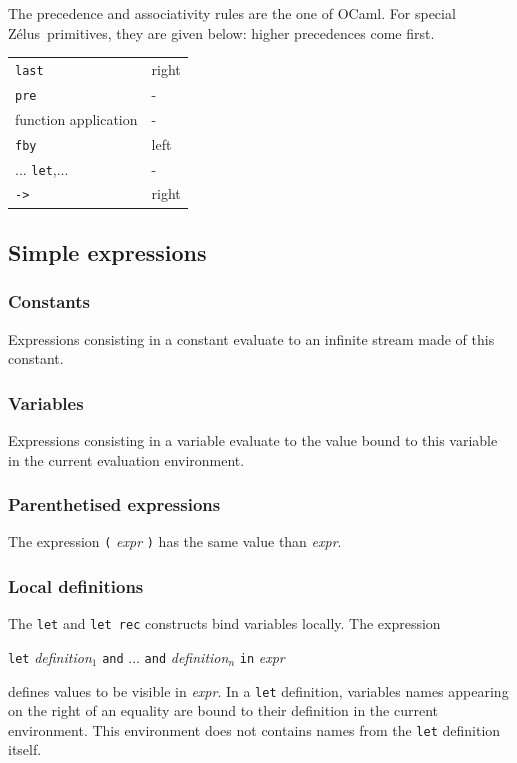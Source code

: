 \documentclass[11pt,titlepage,twoside]{report}
\newcommand{\zelus}{{\sf Z\'elus}}
\newcommand{\ocaml}{{\sf OCaml}}
\newcommand{\Let}{\mbox{{\tt let}}}
\newcommand{\Rec}{\mbox{{\tt rec}}}
\newcommand{\In}{\mbox{{\tt in}}}
\newcommand{\And}{\mbox{{\tt and}}}
\newcommand{\Pre}{\mbox{{\tt pre}}}
\newcommand{\Last}{\mbox{{\tt last}}}
\newcommand{\Fby}{\mbox{{\tt fby}}}
\newcommand{\Minusgreater}{\mbox{{\tt ->}}}
\newcommand{\term}[1]{{\tt #1}}
\newcommand{\nterm}[1]{{\em #1}}
\begin{document}
The precedence and associativity rules are the one of \ocaml. For
special \zelus\ primitives, they are given below:
higher precedences come first.
\begin{center}
{
\begin{tabular}{|l|l|} \hline
\Last                           & right         \\
\Pre                            & -             \\
function application            & -             \\
\Fby                            & left          \\
...
\Let,...                        & -             \\ 
\Minusgreater                   & right         \\ \hline
\end{tabular}
}
\end{center}

\subsection{Simple expressions\label{simpleexpressions}} %
\subsubsection{Constants} %

Expressions consisting in a constant evaluate to an infinite stream
made of this constant.

\subsubsection{Variables} %

Expressions consisting in a variable evaluate to the value bound to
this variable in the current evaluation environment.

\subsubsection{Parenthetised expressions} %
The expression \term{(} \nterm{expr} \term{)} has the same value than
\nterm{expr}.

\subsubsection{Local definitions} %

The \term{\Let} and \term{\Let\ \Rec} constructs bind variables
locally. The expression 
\begin{center}
  \term{\Let} \nterm{definition}$_1$ \term{\And} ... 
  \term{\And} \nterm{definition}$_n$ \term{\In} \nterm{expr}
\end{center}
defines values to be visible in \nterm{expr}. In a \term{\Let} definition,
variables names appearing on the right of an equality are bound to their definition
in the current environment. This environment does not contains names from
the \term{\Let} definition itself.
\end{document}
